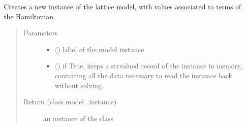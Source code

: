 \documentclass[letterpaper,10pt,english]{sphinxmanual}
\begin{document}

\begin{fulllineitems}
\label{\detokenize{functions:pyqcm.new_model_instance}}
\sphinxAtStartPar
Creates a new instance of the lattice model, with values associated to terms of the Hamiltonian.
\begin{quote}\begin{description}
\item[{Parameters}] \leavevmode\begin{itemize}
\item {} 
\sphinxAtStartPar
{} () \textendash{} label of the model instance

\item {} 
\sphinxAtStartPar
{} () \textendash{} if True, keeps a str\sphinxhyphen{}valued record of the instance in memory, containing all the data necessary to read the instance back without solving.

\end{itemize}

\item[{Return (class model\_instance)}] \leavevmode
\sphinxAtStartPar
an instance of the class 

\end{description}\end{quote}

\end{fulllineitems}

\end{document}
